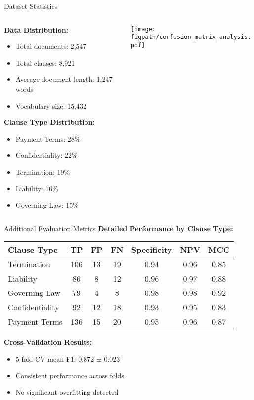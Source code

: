 \begin{frame}{Dataset Statistics}
\begin{columns}
\begin{column}{0.5\textwidth}
\textbf{Data Distribution:}
\begin{itemize}
    \item Total documents: 2,547
    \item Total clauses: 8,921
    \item Average document length: 1,247 words
    \item Vocabulary size: 15,432
\end{itemize}

\vspace{0.5cm}
\textbf{Clause Type Distribution:}
\begin{itemize}
    \item Payment Terms: 28\%
    \item Confidentiality: 22\%
    \item Termination: 19\%
    \item Liability: 16\%
    \item Governing Law: 15\%
\end{itemize}
\end{column}
\begin{column}{0.5\textwidth}
\begin{center}
\texttt{[image: \\figpath/confusion\_matrix\_analysis.pdf]}
\end{center}
\end{column}
\end{columns}
\end{frame}

\begin{frame}{Additional Evaluation Metrics}
\textbf{Detailed Performance by Clause Type:}
\begin{table}[h]
\centering
\scriptsize
\begin{tabular}{@{}lcccccc@{}}
\toprule
\textbf{Clause Type} & \textbf{TP} & \textbf{FP} & \textbf{FN} & \textbf{Specificity} & \textbf{NPV} & \textbf{MCC} \\
\midrule
Termination & 106 & 13 & 19 & 0.94 & 0.96 & 0.85 \\
Liability & 86 & 8 & 12 & 0.96 & 0.97 & 0.88 \\
Governing Law & 79 & 4 & 8 & 0.98 & 0.98 & 0.92 \\
Confidentiality & 92 & 12 & 18 & 0.93 & 0.95 & 0.83 \\
Payment Terms & 136 & 15 & 20 & 0.95 & 0.96 & 0.87 \\
\bottomrule
\end{tabular}
\end{table}

\vspace{0.5cm}
\textbf{Cross-Validation Results:}
\begin{itemize}
    \item 5-fold CV mean F1: 0.872 ± 0.023
    \item Consistent performance across folds
    \item No significant overfitting detected
\end{itemize}
\end{frame}


